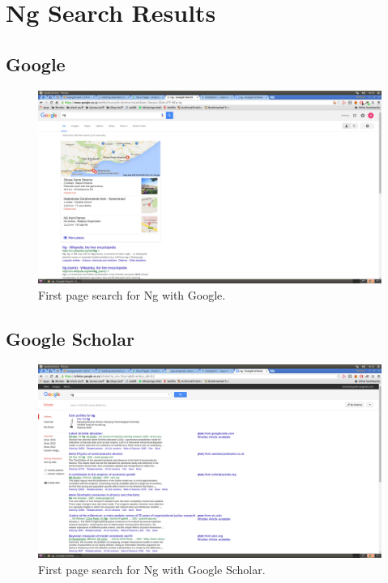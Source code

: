 \documentclass[a4paper]{article}
\begin{document}
\pagebreak

\appendix
\section{Ng Search Results}
\subsection{Google}
\begin{figure}[H]
\centering
\includegraphics[width=1.0\textwidth]{ng-google.png}
\caption{\label{fig:ngg}First page search for Ng with Google.}
\end{figure}

\subsection{Google Scholar}
\begin{figure}[H]
\centering
\includegraphics[width=1.0\textwidth]{ng-scholar.png}
\caption{\label{fig:ngs}First page search for Ng with Google Scholar.}
\end{figure}
\end{document}
